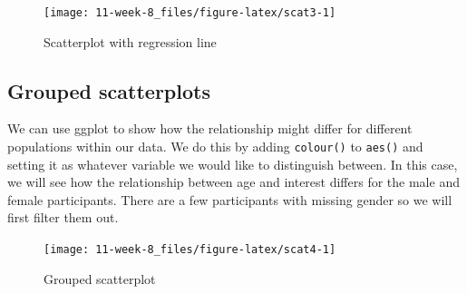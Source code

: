 \documentclass[]{book}
\newenvironment{Shaded}{\begin{snugshade}}{\end{snugshade}}
\newcommand{\DataTypeTok}[1]{\textcolor[rgb]{0.13,0.29,0.53}{#1}}
\newcommand{\KeywordTok}[1]{\textcolor[rgb]{0.13,0.29,0.53}{\textbf{#1}}}
\newcommand{\NormalTok}[1]{#1}
\newcommand{\OperatorTok}[1]{\textcolor[rgb]{0.81,0.36,0.00}{\textbf{#1}}}
\newcommand{\StringTok}[1]{\textcolor[rgb]{0.31,0.60,0.02}{#1}}
\begin{document}
\begin{figure}

{\centering \texttt{[image: 11-week-8\_files/figure-latex/scat3-1]} 

}

\caption{Scatterplot with regression line}\label{fig:scat3}
\end{figure}

\hypertarget{grouped-scatterplots}{%
\subsection{Grouped scatterplots}\label{grouped-scatterplots}}

We can use ggplot to show how the relationship might differ for different populations within our data. We do this by adding \texttt{colour()} to \texttt{aes()} and setting it as whatever variable we would like to distinguish between. In this case, we will see how the relationship between age and interest differs for the male and female participants. There are a few participants with missing gender so we will first filter them out.

\begin{Shaded}
\end{Shaded}

\begin{figure}

{\centering \texttt{[image: 11-week-8\_files/figure-latex/scat4-1]} 

}

\caption{Grouped scatterplot}\label{fig:scat4}
\end{figure}
\end{document}
